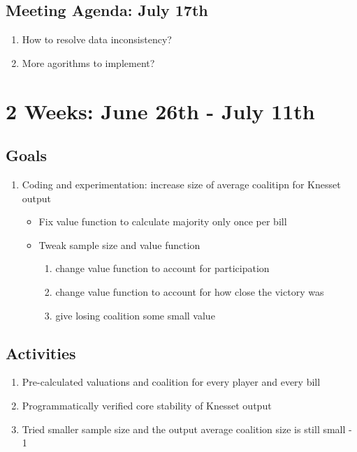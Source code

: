 \documentclass[a4paper]{article}
\begin{document}
\subsection*{Meeting Agenda: July 17th}

\begin{enumerate}
  \item How to resolve data inconsistency?
  \item More agorithms to implement?
\end{enumerate}

\section*{2 Weeks: June 26th - July 11th}

\subsection*{Goals}

\begin{enumerate}
  \item Coding and experimentation: increase size of average coalitipn for Knesset output
  \begin{itemize}
    \item Fix value function to calculate majority only once per bill
    \item Tweak sample size and value function
    \begin{enumerate}
      \item change value function to account for participation
      \item change value function to account for how close the victory was
      \item give losing coalition some small value
    \end{enumerate}
  \end{itemize}
\end{enumerate}

\subsection*{Activities}

\begin{enumerate}
  \item Pre-calculated valuations and coalition for every player and every bill
  \item Programmatically verified core stability of Knesset output
  \item Tried smaller sample size and the output average coalition size is still small - 1
\end{enumerate}
\end{document}
